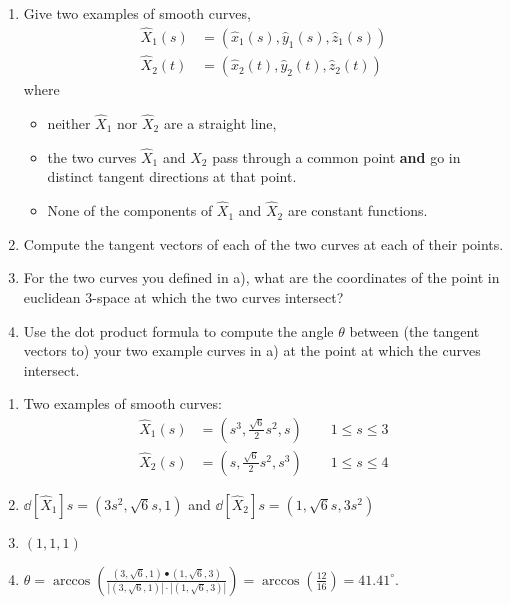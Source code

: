 \documentclass{ximera}
\begin{document}
\begin{problem}\hfil
\begin{enumerate}
\label{1}\item Give two examples of smooth curves,
\begin{align*}
\hat{X}_{1}(s) &=\left(\hat{x}_{1}(s),\hat{y}_{1}(s),\hat{z}_{1}(s)\right) \\
\hat{X}_{2}(t) &=\left(\hat{x}_{2}(t),\hat{y}_{2}(t),\hat{z}_{2}(t)\right)
\end{align*}
where
\begin{itemize}
\item neither $\hat{X}_1$ nor $\hat{X}_2$ are a straight line,
\item the two curves $\hat{X}_1$ and $\hat{X}_2$ pass through a common
  point \textbf{and} go in distinct tangent directions at that point.
\item None of the components of $\hat{X}_1$ and $\hat{X}_2$ are constant functions.
\end{itemize}

\item Compute the tangent vectors of each of the two curves at each of their points.

\item For the two curves you defined in a), what are the coordinates of the point
in euclidean $3$-space at which the two curves intersect?

\item Use the dot product formula to compute the angle $\theta$ between (the
tangent vectors to) your two example curves in a) at the point at which the
curves intersect. %
\end{enumerate}


\begin{freeResponse} 
\begin{enumerate}
\label{1}\item Two examples of smooth curves:
\begin{align*}
\hat{X}_{1}(s) &=\left(s^3, \frac{\sqrt{6}}{2}s^2, s\right) \qquad 1 \leq s\leq3 \\
\hat{X}_{2}(s) &=\left(s, \frac{\sqrt{6}}{2}s^2, s^3\right) \qquad 1 \leq s\leq4
\end{align*}

\item  $\dd[\hat{X}_{1}]{s} = \left(3s^2, \sqrt{6}s, 1 \right)$ and 
$\dd[\hat{X}_{2}]{s} =  \left(1, \sqrt{6}s,  3s^2 \right)$

\item $\left(1,1,1 \right)$

\item 
$\theta = \arccos \left( 
   \frac{ \left(3, \sqrt{6} , 1 \right) \bullet \left(1, \sqrt{6} , 3 \right)}
   { |\left(3, \sqrt{6} , 1 \right)| \cdot |\left(1, \sqrt{6} , 3 \right)|} \right)
= \arccos \left( \frac{12}{16} \right) = 41.41^{\circ}.$

\end{enumerate}
\end{freeResponse}

\end{problem}
\end{document}
